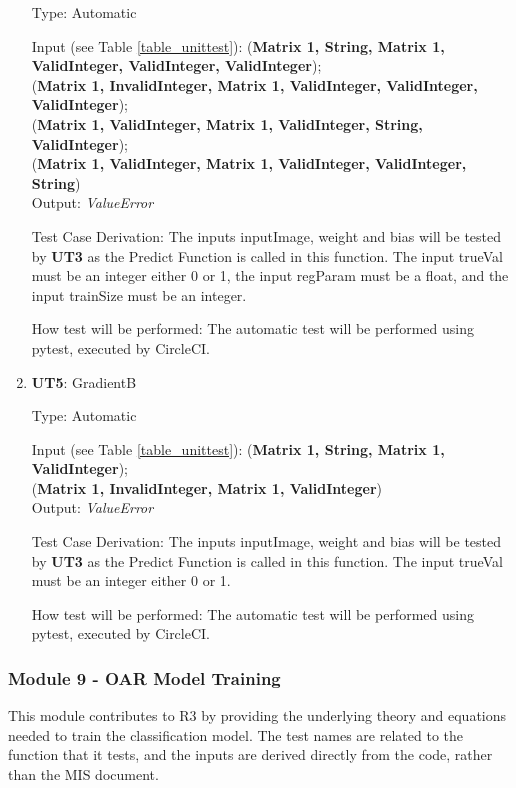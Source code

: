 \documentclass[12pt, titlepage]{article}
\begin{document}
\begin{enumerate}
Type: Automatic
					
Input (see Table \ref{table_unittest}): (\textbf{Matrix 1, String, Matrix 1, ValidInteger, ValidInteger, ValidInteger});\\
(\textbf{Matrix 1, InvalidInteger, Matrix 1, ValidInteger, ValidInteger, ValidInteger});\\
(\textbf{Matrix 1, ValidInteger, Matrix 1, ValidInteger, String, ValidInteger});\\
(\textbf{Matrix 1, ValidInteger, Matrix 1, ValidInteger, ValidInteger, String})\\
					
Output: \textit{ValueError}

Test Case Derivation: The inputs inputImage, weight and bias will be tested by \textbf{UT3} as the Predict Function is called in this function. 
The input trueVal must be an integer either 0 or 1, the input regParam must be a float, and the input trainSize must be an integer.

How test will be performed: The automatic test will be performed using pytest, executed by CircleCI.

\item{\textbf{UT5}: GradientB}

Type: Automatic
					
Input (see Table \ref{table_unittest}): (\textbf{Matrix 1, String, Matrix 1, ValidInteger});\\
(\textbf{Matrix 1, InvalidInteger, Matrix 1, ValidInteger})\\
					
Output: \textit{ValueError}

Test Case Derivation: The inputs inputImage, weight and bias will be tested by \textbf{UT3} as the Predict Function is called in this function. 
The input trueVal must be an integer either 0 or 1.

How test will be performed: The automatic test will be performed using pytest, executed by CircleCI.
\end{enumerate}

\subsubsection{Module 9 - OAR Model Training}
This module contributes to R3 by providing the underlying theory and equations needed to train the classification model.
The test names are related to the function that it tests, and the inputs are derived directly from the code, rather than the MIS document.
\end{document}
